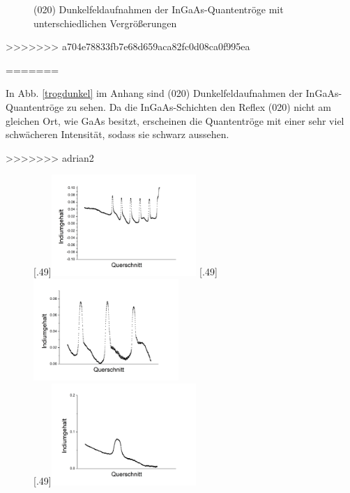 \documentclass[a4paper,11pt,DIV=11]{scrartcl}
\begin{document}
\begin{figure}[htb]
	\caption{(020) Dunkelfeldaufnahmen der InGaAs-Quantentröge mit unterschiedlichen Vergrößerungen} \label{*}
\end{figure}
>>>>>>> a704e78833fb7e68d659aca82fc0d08ca0f995ea

=======


In Abb. \ref{trogdunkel} im Anhang sind (020) Dunkelfeldaufnahmen der InGaAs-Quantentröge zu sehen. Da die InGaAs-Schichten den Reflex (020) nicht am gleichen Ort, wie GaAs besitzt, erscheinen die Quantentröge mit einer sehr viel schwächeren Intensität, sodass sie schwarz aussehen.

>>>>>>> adrian2
\begin{figure}[htb]\centering
	[.49\linewidth]{\includegraphics[width=0.49\textwidth]{Versuchsdaten/11/34000xausschnitt.png}}
	[.49\linewidth]{\includegraphics[width=0.49\textwidth]{Versuchsdaten/11/87000xausschnitt.png}}\\
	[.49\linewidth]{\includegraphics[width=0.49\textwidth]{Versuchsdaten/11/185000xausschnitt.png}}

\end{figure}
\end{document}
